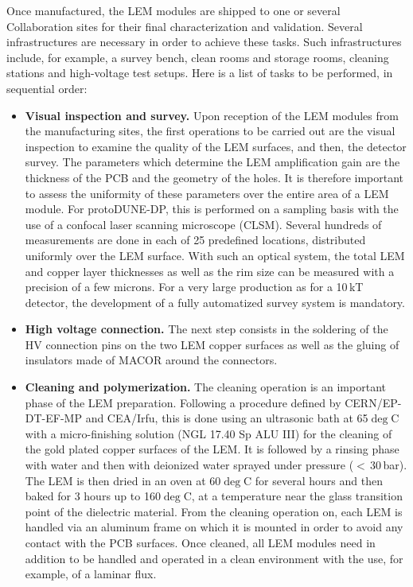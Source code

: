 Once manufactured, the LEM modules are shipped to one or several Collaboration sites for their final characterization and validation. Several infrastructures are necessary in order to achieve these tasks. Such infrastructures include, for example, a survey bench, clean rooms and storage rooms, cleaning stations and high-voltage test setups. Here is a list of tasks to be performed, in sequential order:
\begin{itemize}
\item {\bf Visual inspection and survey.} Upon reception of the LEM modules from the manufacturing sites, the first operations to be carried out are the visual inspection to examine the quality of the LEM surfaces, and then, the detector survey. The parameters which determine the LEM amplification gain are the thickness of the PCB and the geometry of the holes. It is therefore important to assess the uniformity of these parameters over the entire area of a LEM module. For protoDUNE-DP, this is performed on a sampling basis with the use of a confocal laser scanning microscope (CLSM). Several hundreds of measurements are done in each of 25 predefined locations, distributed uniformly over the LEM surface. With such an optical system, the total LEM and copper layer thicknesses as well as the rim size can be measured with a precision of a few microns. For a very large production as for a 10\,kT detector, the development of a fully automatized survey system is mandatory. 
\item {\bf High voltage connection.} The next step consists in the soldering of the HV connection pins on the two LEM copper surfaces as well as the gluing of insulators made of MACOR around the connectors.
\item {\bf Cleaning and polymerization.} The cleaning operation is an important phase of the LEM preparation. Following a procedure defined by CERN/EP-DT-EF-MP and CEA/Irfu, this is done using an ultrasonic bath at 65$\deg$C with a micro-finishing solution (NGL 17.40 Sp ALU III) for the cleaning of the gold plated copper surfaces of the LEM. It is followed by a rinsing phase with water and then with deionized water sprayed under pressure ($<$\,30\,bar). The LEM is then dried in an oven 
at 60$\deg$C for several hours and then baked for 3 hours up to 160$\deg$C, at a temperature near the glass transition point of the dielectric material. From the cleaning operation on, each LEM is handled via an aluminum frame on which it is mounted in order to avoid any contact with the PCB surfaces. Once cleaned, all LEM modules need in addition to be handled and operated in a clean environment with the use, for example, of a laminar flux.  

\end{itemize}
